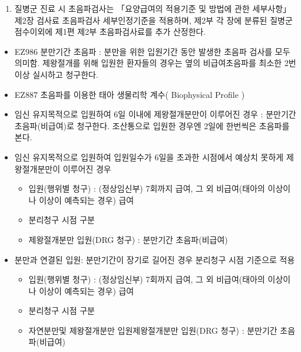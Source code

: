 \clearpage
\begin{myshadowbox}
\begin{enumerate}[15.]\tightlist
\item 질병군 진료 시 초음파검사는 「요양급여의 적용기준 및 방법에 관한 세부사항」제2장 검사료 초음파검사 세부인정기준을 적용하며,  제2부 각 장에 분류된 질병군 점수이외에 제1편 제2부 초음파검사료를 추가 산정한다. 
\end{enumerate}
\end{myshadowbox}
\prezi{\clearpage}
\begin{itemize}\tightlist
	\item EZ986 분만기간 초음파 : 분만을 위한 입원기간 동안 발생한 초음파 검사를 모두 의미함. 제왕절개를 위해 입원한 환자들의 경우는 옆의 비급여초음파를 최소한 2번 이상 실시하고 청구한다.
	\item EZ887 초음파를 이용한 태아 생물리학 계수( Biophysical Profile )
	\item 임신 유지목적으로 입원하여 6일 이내에 제왕절개분만이 이루어진 경우 : 분만기간 초음파(비급여)로 청구한다. 조산통으로 입원한 경우엔 2일에 한번씩은 초음파를 본다.
	\item 임신 유지목적으로 입원하여 입원일수가 6일을 초과한 시점에서 예상치 못하게 제왕절개분만이 이루어진 경우 
		\begin{itemize}\tightlist
		\item 입원(행위별 청구) : (정상임신부) 7회까지 급여, 그 외 비급여(태아의 이상이나 이상이 예측되는 경우) 급여
		\item 분리청구 시점 구분
		\item 제왕절개분만 입원(DRG 청구) : 분만기간 초음파(비급여)
         \end{itemize}                               
	\item 분만과 연결된 입원: 분만기간이 장기로 길어진 경우 분리청구 시점 기준으로 적용
		\begin{itemize}\tightlist
		\item 입원(행위별 청구) : (정상임신부) 7회까지 급여, 그 외 비급여(태아의 이상이나 이상이 예측되는 경우) 급여
		\item 분리청구 시점 구분
		\item 자연분만및 제왕절개분만 입원제왕절개분만 입원(DRG 청구) : 분만기간 초음파(비급여)
         \end{itemize} 	
\end{itemize}
